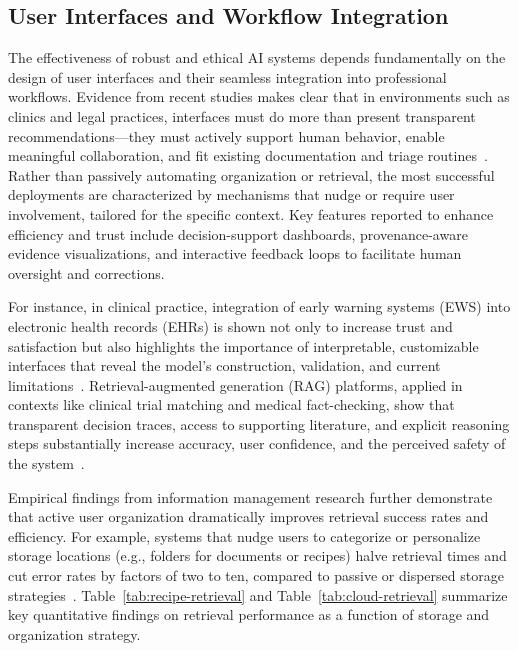 \documentclass[sigconf]{acmart}
\begin{document}
\subsection{User Interfaces and Workflow Integration}

The effectiveness of robust and ethical AI systems depends fundamentally on the design of user interfaces and their seamless integration into professional workflows. Evidence from recent studies makes clear that in environments such as clinics and legal practices, interfaces must do more than present transparent recommendations—they must actively support human behavior, enable meaningful collaboration, and fit existing documentation and triage routines~\cite{ref39,ref40,ref41,ref50,ref52,ref53,ref54,ref55,ref63,ref64}. Rather than passively automating organization or retrieval, the most successful deployments are characterized by mechanisms that nudge or require user involvement, tailored for the specific context. Key features reported to enhance efficiency and trust include decision-support dashboards, provenance-aware evidence visualizations, and interactive feedback loops to facilitate human oversight and corrections.

For instance, in clinical practice, integration of early warning systems (EWS) into electronic health records (EHRs) is shown not only to increase trust and satisfaction but also highlights the importance of interpretable, customizable interfaces that reveal the model's construction, validation, and current limitations~\cite{ref50}. Retrieval-augmented generation (RAG) platforms, applied in contexts like clinical trial matching and medical fact-checking, show that transparent decision traces, access to supporting literature, and explicit reasoning steps substantially increase accuracy, user confidence, and the perceived safety of the system~\cite{ref52,ref53,ref54,ref55}.

Empirical findings from information management research further demonstrate that active user organization dramatically improves retrieval success rates and efficiency. For example, systems that nudge users to categorize or personalize storage locations (e.g., folders for documents or recipes) halve retrieval times and cut error rates by factors of two to ten, compared to passive or dispersed storage strategies~\cite{ref39,ref40}. Table~\ref{tab:recipe-retrieval} and Table~\ref{tab:cloud-retrieval} summarize key quantitative findings on retrieval performance as a function of storage and organization strategy.
\end{document}
